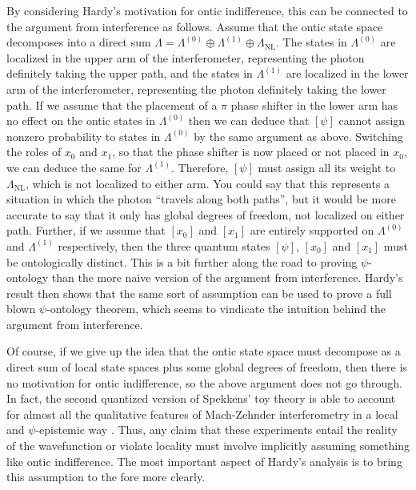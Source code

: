 \documentclass[DIV=calc,fontsize=12pt]{scrartcl} %
\theoremstyle{definition}
\theoremstyle{plain}
\newcommand{\Proj}[1]{\ensuremath{\left [ #1 \right ]}}
\begin{document}
By considering Hardy's motivation for ontic indifference, this can be
connected to the argument from interference as follows.  Assume that
the ontic state space decomposes into a direct sum $\Lambda =
\Lambda^{(0)} \oplus \Lambda^{(1)} \oplus \Lambda_{\text{NL}}$.  The
states in $\Lambda^{(0)}$ are localized in the upper arm of the
interferometer, representing the photon definitely taking the upper
path, and the states in $\Lambda^{(1)}$ are localized in the lower arm
of the interferometer, representing the photon definitely taking the
lower path.  If we assume that the placement of a $\pi$ phase shifter
in the lower arm has no effect on the ontic states in $\Lambda^{(0)}$
then we can deduce that $\Proj{\psi}$ cannot assign nonzero
probability to states in $\Lambda^{(0)}$ by the same argument as
above.  Switching the roles of $x_0$ and $x_1$, so that the phase
shifter is now placed or not placed in $x_0$, we can deduce the same
for $\Lambda^{(1)}$.  Therefore, $\Proj{\psi}$ must assign all its
weight to $\Lambda_{\text{NL}}$, which is not localized to either arm.
You could say that this represents a situation in which the photon
``travels along both paths'', but it would be more accurate to say
that it only has global degrees of freedom, not localized on either
path.  Further, if we assume that $\Proj{x_0}$ and $\Proj{x_1}$ are
entirely supported on $\Lambda^{(0)}$ and $\Lambda^{(1)}$
respectively, then the three quantum states $\Proj{\psi}$,
$\Proj{x_0}$ and $\Proj{x_1}$ must be ontologically distinct.  This is
a bit further along the road to proving $\psi$-ontology than the more
naive version of the argument from interference.  Hardy's result then
shows that the same sort of assumption can be used to prove a full
blown $\psi$-ontology theorem, which seems to vindicate the intuition
behind the argument from interference.

Of course, if we give up the idea that the ontic state space must
decompose as a direct sum of local state spaces plus some global
degrees of freedom, then there is no motivation for ontic
indifference, so the above argument does not go through.  In fact, the
second quantized version of Spekkens' toy theory is able to account
for almost all the qualitative features of Mach-Zehnder interferometry
in a local and $\psi$-epistemic way \cite{Martin2014}.  Thus, any
claim that these experiments entail the reality of the wavefunction or
violate locality must involve implicitly assuming something like ontic
indifference.  The most important aspect of Hardy's analysis is to
bring this assumption to the fore more clearly.
\end{document}
